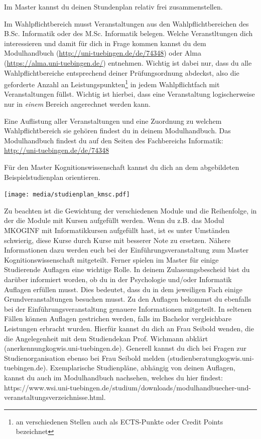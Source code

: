 Im Master kannst du deinen Stundenplan relativ frei zusammenstellen.

\iflehramt
	Im Wahlpflichtbereich musst Veranstaltungen aus den Wahlpflichtbereichen des B.Sc. Informatik oder des M.Sc. Informatik belegen. 
	Welche Veranstltungen dich interessieren und damit für dich in Frage kommen kannst du dem Modulhandbuch (\url{http://uni-tuebingen.de/de/74348}) oder Alma (\url{https://alma.uni-tuebingen.de/}) entnehmen. 
\else
	Wichtig ist dabei nur, dass du alle Wahlpflichtbereiche entsprechend deiner Prüfungsordnung abdeckst,
	also die geforderte Anzahl an Leistungspunkten\footnote{an verschiedenen Stellen auch als ECTS-Punkte oder Credit Points bezeichnet}
	in jedem Wahlpflichtfach mit Veranstaltungen füllst. Wichtig ist hierbei, dass eine Veranstaltung logischerweise nur in \emph{einem} Bereich angerechnet
	werden kann.

	Eine Auflistung aller Veranstaltungen und eine Zuordnung zu welchem Wahlpflichtbereich sie gehören
	findest du in deinem Modulhandbuch. Das Modulhandbuch findest du auf den Seiten des Fachbereichs Informatik: \\ 
	\url{http://uni-tuebingen.de/de/74348}
\fi

\ifkogwiss
Für den Master Kognitionswissenschaft kannst du dich an dem abgebildeten Beispielstudienplan orientieren.
\begin{center}
	\texttt{[image: media/studienplan\_kmsc.pdf]}
\end{center}
Zu beachten ist die Gewichtung der verschiedenen Module und die Reihenfolge, in der die Module mit Kursen aufgefüllt werden. Wenn
du z.B. das Modul MKOGINF mit Informatikkursen aufgefüllt hast, ist es unter Umständen schwierig, diese Kurse durch Kurse mit
besserer Note zu ersetzen. Nähere Informationen dazu werden euch bei der Einführungsveranstaltung zum Master Kognitionswissenschaft mitgeteilt. Ferner spielen im Master für einige Studierende Auflagen eine wichtige Rolle. In deinem Zulassungsbescheid bist du darüber informiert worden, ob du in der Psychologie und/oder Informatik Auflagen erfüllen musst. Dies bedeutet, dass du in dem jeweiligen Fach einige Grundveranstaltungen besuchen musst. Zu den Auflagen bekommst du ebenfalls bei der Einführungsveranstaltung genauere Informationen mitgeteilt. In seltenen Fällen können Auflagen gestrichen werden, falls im Bachelor vergleichbare Leistungen erbracht wurden. Hierfür kannst du dich an Frau Seibold wenden, die die Angelegenheit mit dem Studiendekan Prof. Wichmann abklärt (anerkennung\At kogwis.uni-tuebingen.de). Generell kannst du dich bei Fragen zur Studienorganisation ebenso bei Frau Seibold melden (studienberatung\At kogwis.uni-tuebingen.de). Exemplarische Studienpläne, abhängig von deinen Auflagen, kannst du auch im Modulhandbuch nachsehen, welches du hier findest: https://www.wsi.uni-tuebingen.de/studium/downloads/modulhandbuecher-und-veranstaltungsverzeichnisse.html.
\fi

